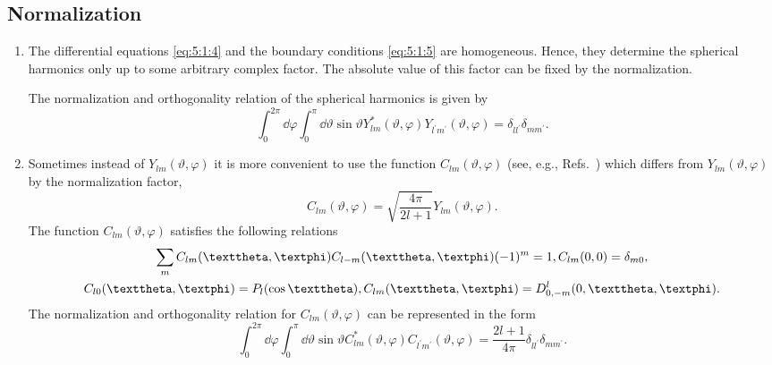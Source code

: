 \subsection{Normalization}\label{sec:5.1.4}
\begin{enumerate}[label=(\alph*)]
\item The differential equations \eqref{eq:5:1:4} and the boundary conditions \eqref{eq:5:1:5} are homogeneous. Hence, they determine the spherical harmonics only up to some arbitrary complex factor. The absolute value of this factor can be fixed by the normalization.

The normalization and orthogonality relation of the spherical harmonics is given by
\begin{equation}
\int_{0}^{2 \pi} \dd \varphi \int_{0}^{\pi} \dd \vartheta \sin \vartheta Y_{l m}^{*}(\vartheta, \varphi) Y_{l^{\prime} m^{\prime}}(\vartheta, \varphi)=\delta_{l l^{\prime}} \delta_{m m^{\prime}} .\label{eq:5:1:6}
\end{equation}
\item Sometimes instead of $Y_{l m}(\vartheta, \varphi)$ it is more convenient to use the function $C_{l m}(\vartheta, \varphi)$ (see, e.g., Refs.~\cite{ref009,ref024}) which differs from $Y_{l m}(\vartheta, \varphi)$ by the normalization factor,
\begin{equation}
C_{l m}(\vartheta, \varphi)=\sqrt{\frac{4 \pi}{2 l+1}} Y_{l m}(\vartheta, \varphi). \label{eq:5:1:7}
\end{equation}
The function $C_{l m}(\vartheta, \varphi)$ satisfies the following relations
\begin{gather}
\sum_{m} C_{l m}(\vartheta, \varphi) C_{l-m}(\vartheta, \varphi)(-1)^{m}=1, C_{l m}(0,0)=\delta_{m 0} , \label{eq:5:1:8}\\
C_{l 0}(\vartheta, \varphi)=P_{l}(\cos \vartheta), C_{l m}(\vartheta, \varphi)=D_{0,-m}^{l}(0, \vartheta, \varphi). \notag
\end{gather}
The normalization and orthogonality relation for $C_{l m}(\vartheta, \varphi)$ can be represented in the form
\begin{equation}
\int_{0}^{2 \pi} \dd \varphi \int_{0}^{\pi} \dd \vartheta \sin \vartheta C_{l m}^{*}(\vartheta, \varphi) C_{l^{\prime} m^{\prime}}(\vartheta, \varphi)=\frac{2 l+1}{4 \pi} \delta_{l l^{\prime}} \delta_{m m^{\prime}} .\label{eq:5:1:9}
\end{equation}
\end{enumerate}
